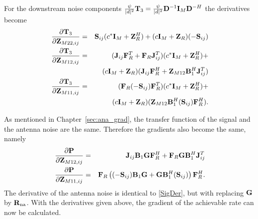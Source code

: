 For the downstream noise components $\frac{\psi}{|d|^2}\mathbf{T}_3=\frac{\psi}{|d|^2}\mathbf{D}^{-1}\mathbf{I}_M\mathbf{D}^{{-H}}$ the derivatives become
\begin{eqnarray}
\frac{\partial \mathbf{T}_3}{\partial \mathbf{Z}_{M22,ij}}&=&\mathbf{S}_{ij}(c^*\mathbf{I}_M+\mathbf{Z}_{R}^H)+ 
(c\mathbf{I}_M+\mathbf{Z}_{R})(-\mathbf{S}_{ij}) \nonumber\\
\frac{\partial \mathbf{T}_3}{\partial \mathbf{Z}_{M12,ij}}&=&(\mathbf{J}_{ij}\mathbf{F}_R^T+\mathbf{F}_R\mathbf{J}_{ij}^T)
(c^*\mathbf{I}_M+\mathbf{Z}_R^H)+ \nonumber \\
 && (c\mathbf{I}_M+\mathbf{Z}_R) 
(\mathbf{J}_{ij}\mathbf{F}_R^H+\mathbf{Z}_{M12}\mathbf{B}_1^H\mathbf{J}_{ij}^T)  \nonumber \\
\frac{\partial \mathbf{T}_3}{\partial \mathbf{Z}_{M11,ij}}&=& (\mathbf{F}_R(-\mathbf{S}_{ij})\mathbf{F}_R^T)(c^*\mathbf{I}_M+\mathbf{Z}_R^H)+   \nonumber \\
&&  (c\mathbf{I}_M+\mathbf{Z}_R)(\mathbf{Z}_{M12}\mathbf{B}_1^H(\mathbf{S}_{ij})\mathbf{F}_R^H).
\label{ShortenedPostLNA}
\end{eqnarray}

As mentioned in Chapter~\ref{sec:ana_grad}, the transfer function of the signal and the antenna noise are the same.
Therefore the gradients also become the same, namely
\begin{eqnarray}
\frac{\partial \mathbf{P}}{\partial \mathbf{Z}_{M12,ij}}&=&\mathbf{J}_{ij}\mathbf{B}_1\mathbf{G} \mathbf{F}_R^H+ 
 \mathbf{F}_R\mathbf{G} \mathbf{B}_1^H\mathbf{J}_{ij}^T \nonumber\\
\frac{\partial \mathbf{P}}{\partial \mathbf{Z}_{M11,ij}}&=&\mathbf{F}_R\left((-\mathbf{S}_{ij})\mathbf{B}_1\mathbf{G} + \mathbf{G}\mathbf{B}_1^H(\mathbf{S}_{ij}) \right)\mathbf{F}_R^H.
\label{SigDer}
\end{eqnarray}
The derivative of the antenna noise is identical to \eqref{SigDer}, but with replacing $\mathbf{G}$ by $\mathbf{R}_{\text{na}}$. With the derivatives given above, the gradient of the achievable rate can now be calculated.




